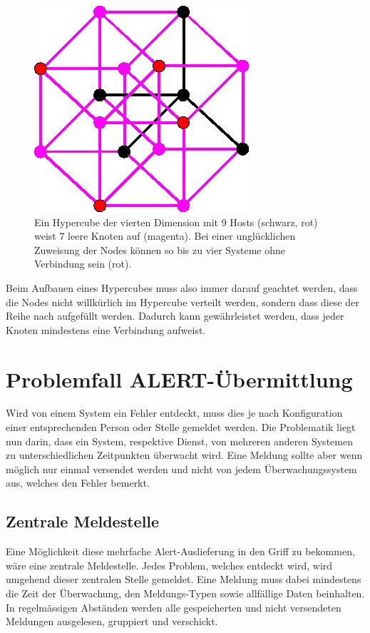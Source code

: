 \begin{figure}[ht]
  \centering
  \includegraphics[width=0.5\linewidth]{images/theorie/hyper-spof-9hosts}
  \caption[Ein Hypercube der vierten Dimension]{Ein Hypercube der vierten Dimension mit 9 Hosts (schwarz, rot) weist 7 leere Knoten auf (magenta). Bei einer ungl\"ucklichen Zuweisung der Nodes k\"onnen so bis zu vier Systeme ohne Verbindung sein (rot).}
  \label{fig:hyper-spof-9hosts}
\end{figure}

Beim Aufbauen eines Hypercubes muss also immer darauf geachtet werden, dass die Nodes nicht willk\"urlich im Hypercube verteilt werden, sondern dass diese der Reihe nach aufgef\"ullt werden. Dadurch kann gew\"ahrleistet werden, dass jeder Knoten mindestens eine Verbindung aufweist.



\section{Problemfall ALERT-\"Ubermittlung} \label{sec:theorie-alert}
Wird von einem System ein Fehler entdeckt, muss dies je nach Konfiguration einer entsprechenden Person oder Stelle gemeldet werden. Die Problematik liegt nun darin, dass ein System, respektive Dienst, von mehreren anderen Systemen zu unterschiedlichen Zeitpunkten \"uberwacht wird. Eine Meldung sollte aber wenn m\"oglich nur einmal versendet werden und nicht von jedem \"Uberwachungssystem aus, welches den Fehler bemerkt.

\subsection{Zentrale Meldestelle} \label{sec:theorie-alert-zentral}
Eine M\"oglichkeit diese mehrfache Alert-Auslieferung in den Griff zu bekommen, w\"are eine zentrale Meldestelle. Jedes Problem, welches entdeckt wird, wird umgehend dieser zentralen Stelle gemeldet. Eine Meldung muss dabei mindestens die Zeit der \"Uberwachung, den Meldungs-Typen sowie allf\"allige Daten beinhalten. In regelm\"assigen Abst\"anden werden alle gespeicherten und nicht versendeten Meldungen ausgelesen, gruppiert und verschickt.

